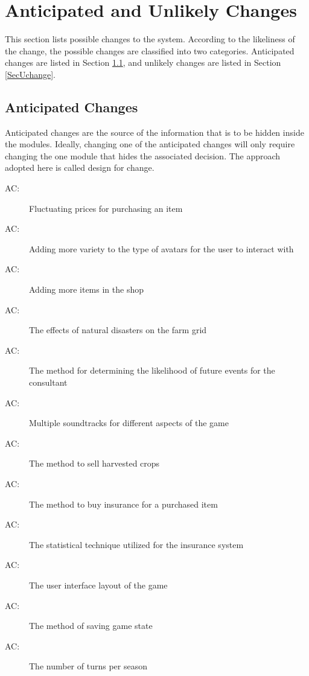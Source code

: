 \documentclass[12pt, titlepage]{article}
\newcounter{acnum}
\newcommand{\actheacnum}{AC\theacnum}
\begin{document}
\section{Anticipated and Unlikely Changes} \label{SecChange}

This section lists possible changes to the system. According to the likeliness
of the change, the possible changes are classified into two
categories. Anticipated changes are listed in Section \ref{SecAchange}, and
unlikely changes are listed in Section \ref{SecUchange}.

\subsection{Anticipated Changes} \label{SecAchange}

Anticipated changes are the source of the information that is to be hidden
inside the modules. Ideally, changing one of the anticipated changes will only
require changing the one module that hides the associated decision. The approach
adopted here is called design for
change.

\begin{description}
\item[ \actheacnum \label{PriceFluctuate}:] Fluctuating prices for purchasing an item
\item[ \actheacnum \label{AvatarVariety}:] Adding more variety to the type of avatars for the user to interact with
\item[ \actheacnum \label{ItemVariety}:] Adding more items in the shop
\item[ \actheacnum \label{EventMechanism}:] The effects of natural disasters on the farm grid
\item[ \actheacnum \label{ConsultantMechanism}:] The method for determining the likelihood of future events for the consultant
\item[ \actheacnum \label{SoundtrackVariety}:] Multiple soundtracks for different aspects of the game
\item[ \actheacnum \label{SellOptions}:] The method to sell harvested crops 
\item[ \actheacnum \label{PurchaseInsurance}:] The method to buy insurance for a purchased item
\item[ \actheacnum \label{InsuranceAlgorithm}:] The statistical technique utilized for the insurance system
\item[ \actheacnum \label{UIComponents}:] The user interface layout of the game
\item[ \actheacnum \label{SaveGame}:] The method of saving game state
\item[ \actheacnum \label{TurnNumber}:] The number of turns per season


\end{description}
\end{document}
